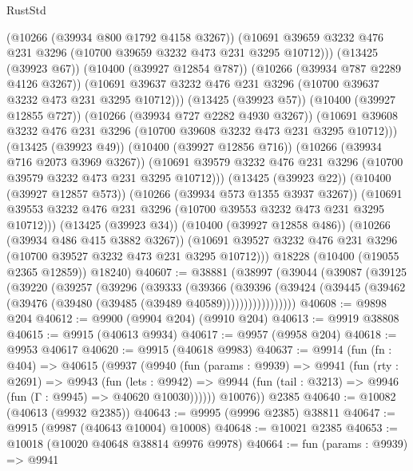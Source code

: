 \begin{lexlean}{RustStd}
\begin{coremodule}
                  (@10266 (@39934 @800 @1792 @4158 @3267))
                  (@10691
                    @39659
                    @3232
                    @476
                    @231
                    @3296
                    (@10700 @39659 @3232 @473 @231 @3295 @10712)))
                (@13425 (@39923 @67))
                (@10400 (@39927 @12854 @787))
                (@10266 (@39934 @787 @2289 @4126 @3267))
                (@10691 @39637 @3232 @476 @231 @3296 (@10700 @39637 @3232 @473 @231 @3295 @10712)))
              (@13425 (@39923 @57))
              (@10400 (@39927 @12855 @727))
              (@10266 (@39934 @727 @2282 @4930 @3267))
              (@10691 @39608 @3232 @476 @231 @3296 (@10700 @39608 @3232 @473 @231 @3295 @10712)))
            (@13425 (@39923 @49))
            (@10400 (@39927 @12856 @716))
            (@10266 (@39934 @716 @2073 @3969 @3267))
            (@10691 @39579 @3232 @476 @231 @3296 (@10700 @39579 @3232 @473 @231 @3295 @10712)))
          (@13425 (@39923 @22))
          (@10400 (@39927 @12857 @573))
          (@10266 (@39934 @573 @1355 @3937 @3267))
          (@10691 @39553 @3232 @476 @231 @3296 (@10700 @39553 @3232 @473 @231 @3295 @10712)))
        (@13425 (@39923 @34))
        (@10400 (@39927 @12858 @486))
        (@10266 (@39934 @486 @415 @3882 @3267))
        (@10691 @39527 @3232 @476 @231 @3296 (@10700 @39527 @3232 @473 @231 @3295 @10712)))
      @18228
      (@10400 (@19055 @2365 @12859))
      @18240)
@40607 := @38881
    (@38997
      (@39044
        (@39087
          (@39125
            (@39220
              (@39257
                (@39296
                  (@39333
                    (@39366
                      (@39396
                        (@39424
                          (@39445 (@39462 (@39476 (@39480 (@39485 (@39489 @40589)))))))))))))))))
@40608 := @9898 @204
@40612 := @9900 (@9904 @204) (@9910 @204)
@40613 := @9919 @38808
@40615 := @9915 (@40613 @9934)
@40617 := @9957 (@9958 @204)
@40618 := @9953 @40617
@40620 := @9915 (@40618 @9983)
@40637 := @9914
    (fun (fn : @404) =>
    @40615
      (@9937
        (@9940
          (fun (params : @9939) =>
          @9941
            (fun (rty : @2691) =>
            @9943
              (fun (lets : @9942) =>
              @9944 (fun (tail : @3213) => @9946 (fun (Γ : @9945) => @40620 @10030))))))
        @10076))
    @2385
@40640 := @10082 (@40613 (@9932 @2385))
@40643 := @9995 (@9996 @2385) @38811
@40647 := @9915 (@9987 (@40643 @10004) @10008)
@40648 := @10021 @2385
@40653 := @10018 (@10020 @40648 @38814 @9976 @9978)
@40664 := fun (params : @9939) =>
  @9941

\end{coremodule}
\end{lexlean}
